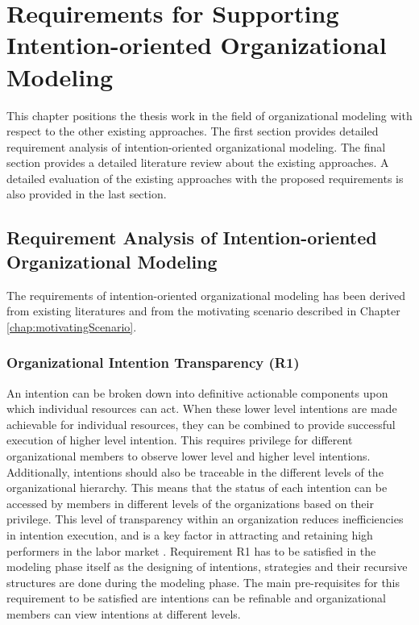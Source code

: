 \chapter{Requirements for Supporting Intention-oriented Organizational Modeling}
\label{chap:analysis}
This chapter positions the thesis work in the field of organizational modeling with respect to the other existing approaches. The first section provides detailed requirement analysis of intention-oriented organizational modeling. The final section provides a detailed literature review about the existing approaches. A detailed evaluation of the existing approaches with the proposed requirements is also provided in the last section.

\section{Requirement Analysis of Intention-oriented Organizational Modeling}
\label{sec:requirementssupoorting}
The requirements of intention-oriented organizational modeling has been derived from existing literatures \cite{McManus2007, Mandic2010,Bleistein2006, Lacom, Brambilla2012} and from the motivating scenario described in Chapter \ref{chap:motivatingScenario}. 

\subsection{Organizational Intention Transparency (R1)}
An intention can be broken down into definitive actionable components upon which individual resources can act. When these lower level intentions are made achievable for individual resources, they can be combined to provide successful execution of higher level intention. This requires privilege for different organizational members to observe lower level and higher level intentions. Additionally, intentions should also be traceable in the different levels of the organizational hierarchy. This means that the status of each intention can be accessed by members in different levels of the organizations based on their privilege. This level of transparency within an organization reduces inefficiencies in intention execution, and is a key factor in attracting and retaining high performers in the labor market \cite{McManus2007}. Requirement R1 has to be satisfied in the modeling phase itself as the designing of intentions, strategies and their recursive structures are done during the modeling phase. The main pre-requisites for this requirement to be satisfied are intentions can be refinable and organizational members can view intentions at different levels. 

